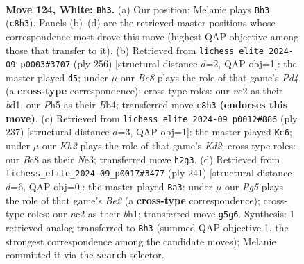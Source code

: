 \documentclass[11pt]{article}
\begin{document}
\clearpage

\begin{figure}[p]\centering
\begin{subfigure}{0.46\textwidth}\centering
\resizebox{\linewidth}{!}{%
\newchessgame
\chessboard[
  setfen={2B5/5k2/8/6PP/8/8/2n4K/8 w - - 17 124},
  showmover=false,
  pgfstyle=straightmove, color=movearrow, markmove={c8-h3}
]}
\caption{}
\end{subfigure}\hfill
\begin{subfigure}{0.46\textwidth}\centering
\resizebox{\linewidth}{!}{%
\newchessgame
\chessboard[
  setfen={8/5k2/2K5/6P1/1B1P4/8/8/3b4 w - - 1 129},
  showmover=false,
  pgfstyle=straightmove, color=movearrow, markmove={d4-d5}
]}
\caption{}
\end{subfigure}
\\[4pt]
\begin{subfigure}{0.46\textwidth}\centering
\resizebox{\linewidth}{!}{%
\newchessgame
\chessboard[
  setfen={8/3k4/6N1/2p5/p7/2K1n3/8/8 b - - 15 119},
  showmover=false,
  pgfstyle=straightmove, color=movearrow, markmove={d7-c6}
]}
\caption{}
\end{subfigure}\hfill
\begin{subfigure}{0.46\textwidth}\centering
\resizebox{\linewidth}{!}{%
\newchessgame
\chessboard[
  setfen={8/4b3/8/8/5k2/8/5K1p/7B b - - 1 121},
  showmover=false,
  pgfstyle=straightmove, color=movearrow, markmove={e7-a3}
]}
\caption{}
\end{subfigure}
\caption{\textbf{Move 124, White: \texttt{Bh3}.} (a) Our position; Melanie plays \texttt{Bh3} (\texttt{c8h3}). Panels (b)--(d) are the retrieved master positions whose correspondence most drove this move (highest QAP objective among those that transfer to it). (b) Retrieved from \texttt{lichess\_elite\_2024-09\_p0003\#3707} (ply 256) [structural distance $d$=2, QAP obj=1]: the master played \texttt{d5}; under $\mu$ our \emph{Bc8} plays the role of that game's \emph{Pd4} (a \textbf{cross-type} correspondence); cross-type roles: our \emph{n}c2 as their \emph{b}d1, our \emph{P}h5 as their \emph{B}b4; transferred move \texttt{c8h3} \textbf{(endorses this move)}. (c) Retrieved from \texttt{lichess\_elite\_2024-09\_p0012\#886} (ply 237) [structural distance $d$=3, QAP obj=1]: the master played \texttt{Kc6}; under $\mu$ our \emph{Kh2} plays the role of that game's \emph{Kd2}; cross-type roles: our \emph{B}c8 as their \emph{N}e3; transferred move \texttt{h2g3}. (d) Retrieved from \texttt{lichess\_elite\_2024-09\_p0017\#3477} (ply 241) [structural distance $d$=6, QAP obj=0]: the master played \texttt{Ba3}; under $\mu$ our \emph{Pg5} plays the role of that game's \emph{Be2} (a \textbf{cross-type} correspondence); cross-type roles: our \emph{n}c2 as their \emph{b}h1; transferred move \texttt{g5g6}. Synthesis: 1 retrieved analog transferred to \texttt{Bh3} (summed QAP objective 1, the strongest correspondence among the candidate moves); Melanie committed it via the \texttt{search} selector.}
\label{fig:thought-m246}
\end{figure}
\end{document}
